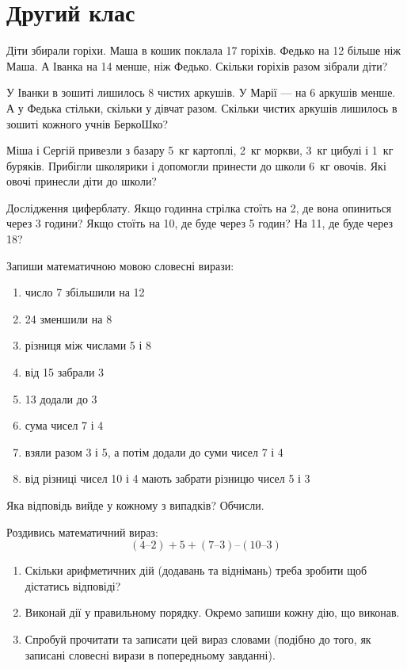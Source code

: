 \chapter{Другий клас}

\problem
Діти збирали горіхи. Маша в кошик поклала 17 горіхів.
Федько на 12 більше ніж Маша. А Іванка на 14 менше, ніж Федько.
Скільки горіхів разом зібрали діти?


\problem
У Іванки в зошиті лишилось 8 чистих аркушів.
У Марії --- на 6 аркушів менше.
А у Федька стільки, скільки у дівчат разом.
Скільки чистих аркушів лишилось в зошиті кожного учнів БеркоШко?


\problem
Міша і Сергій привезли з базару 5~кг картоплі, 2~кг моркви,
3~кг цибулі і 1~кг буряків.
Прибігли школярики і допомогли принести до школи 6~кг овочів.
Які овочі принесли діти до школи?


\problem
Дослідження циферблату.
Якщо годинна стрілка стоїть на 2, де вона опиниться через 3 години?
Якщо стоїть на 10, де буде через 5 годин?
На 11, де буде через 18?


\problem
Запиши математичною мовою словесні вирази:
\begin{enumerate}
    \item число 7 збільшили на 12
    \item 24 зменшили на 8
    \item різниця між числами 5 і 8
    \item від 15 забрали 3
    \item 13 додали до 3
    \item сума чисел 7 і 4
    \item взяли разом 3 і 5, а потім додали до суми чисел 7 і 4
    \item від різниці чисел 10 і 4 мають забрати різницю чисел 5 і 3
\end{enumerate}
Яка відповідь вийде у кожному з випадків? Обчисли.


\problem
Роздивись математичний вираз:
\[
(4 – 2) + 5 + (7 – 3) – (10 – 3)
\]
\begin{enumerate}
    \item Скільки арифметичних дій (додавань та віднімань)
    треба зробити щоб дістатись відповіді?
    \item Виконай дії у правильному порядку.
    Окремо запиши кожну дію, що виконав.
    \item Спробуй прочитати та записати цей вираз словами
    (подібно до того, як записані словесні вирази в попередньому завданні).
\end{enumerate}


